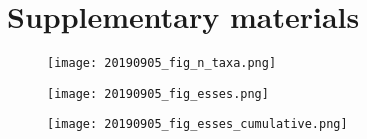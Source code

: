 \section{Supplementary materials}

\begin{figure}[!htbp]
  \texttt{[image: 20190905\_fig\_n\_taxa.png]}
  \label{fig:n_taxa}
\end{figure}

\begin{figure}[!htbp]
  \texttt{[image: 20190905\_fig\_esses.png]}
  \label{fig:esses}
\end{figure}

\begin{figure}[!htbp]
  \texttt{[image: 20190905\_fig\_esses\_cumulative.png]}
  \label{fig:esses_cumulative}
  \caption{}
\end{figure}




